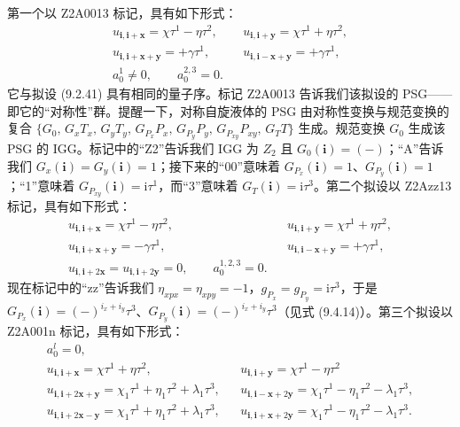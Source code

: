 第一个以 Z2A0013 标记，具有如下形式：
\begin{equation*}
\begin{array}{rcl}
u_{\pmb{i},\pmb{i}+\pmb{x}}=\chi\tau^{1}-\eta\tau^{2}, & & u_{\pmb{i},\pmb{i}+\pmb{y}}=\chi\tau^{1}+\eta\tau^{2},\\[2pt]
u_{\pmb{i},\pmb{i}+\pmb{x}+\pmb{y}}=+\gamma\tau^{1}, & & u_{\pmb{i},\pmb{i}-\pmb{x}+\pmb{y}}=+\gamma\tau^{1},\\[2pt]
a_{0}^{1}\neq0,\qquad a_{0}^{2,3}=0. & &
\end{array}
\tag{9.6.1}
\end{equation*}
它与拟设 (9.2.41) 具有相同的量子序。标记 Z2A0013 告诉我们该拟设的 PSG——即它的“对称性”群。提醒一下，对称自旋液体的 PSG 由对称性变换与规范变换的复合 $\{G_{0},\allowbreak\,G_{x}T_{x},\allowbreak\,G_{y}T_{y},\allowbreak\,G_{P_{x}}P_{x},\allowbreak\,G_{P_{y}}P_{y},\allowbreak\,G_{P_{xy}}P_{xy},\allowbreak\,G_{T}T\}$ 生成。规范变换 $G_{0}$ 生成该 PSG 的 IGG。标记中的“Z2”告诉我们 IGG 为 $Z_{2}$ 且 $G_{0}(\pmb{i})=(-)$；“A”告诉我们 $G_{x}(\pmb{i})=G_{y}(\pmb{i})=1$；接下来的“00”意味着 $G_{P_{x}}(\pmb{i})=1$、$G_{P_{y}}(\pmb{i})=1$；“1”意味着 $G_{P_{xy}}(\pmb{i})=\mathrm{i}\tau^{1}$，而“3”意味着 $G_{T}(\pmb{i})=\mathrm{i}\tau^{3}$。第二个拟设以 Z2Azz13 标记，具有如下形式：
\begin{equation*}
\begin{array}{rcl}
u_{\pmb{i},\pmb{i}+\pmb{x}}=\chi\tau^{1}-\eta\tau^{2}, & & u_{\pmb{i},\pmb{i}+\pmb{y}}=\chi\tau^{1}+\eta\tau^{2},\\[2pt]
u_{\pmb{i},\pmb{i}+\pmb{x}+\pmb{y}}=-\gamma\tau^{1}, & & u_{\pmb{i},\pmb{i}-\pmb{x}+\pmb{y}}=+\gamma\tau^{1},\\[2pt]
u_{\pmb{i},\pmb{i}+2\pmb{x}}=u_{\pmb{i},\pmb{i}+2\pmb{y}}=0,\qquad a_{0}^{1,2,3}=0. & &
\end{array}
\tag{9.6.2}
\end{equation*}
现在标记中的“zz”告诉我们 $\eta_{xpx}=\eta_{xpy}=-1$，$g_{P_{x}}=g_{P_{y}}=\mathrm{i}\tau^{3}$，于是 $G_{P_{x}}(\pmb{i})=(-)^{i_{x}+i_{y}}\tau^{3}$、$G_{P_{y}}(\pmb{i})=(-)^{i_{x}+i_{y}}\tau^{3}$（见式 (9.4.14)）。第三个拟设以 Z2A001n 标记，具有如下形式：
\begin{equation*}
\begin{array}{rcl}
a_{0}^{l}=0, & & \\[2pt]
u_{\pmb{i},\pmb{i}+\pmb{x}}=\chi\tau^{1}+\eta\tau^{2}, & & u_{\pmb{i},\pmb{i}+\pmb{y}}=\chi\tau^{1}-\eta\tau^{2}\\[2pt]
u_{\pmb{i},\pmb{i}+2\pmb{x}+\pmb{y}}=\chi_{1}\tau^{1}+\eta_{1}\tau^{2}+\lambda_{1}\tau^{3}, & & u_{\pmb{i},\pmb{i}-\pmb{x}+2\pmb{y}}=\chi_{1}\tau^{1}-\eta_{1}\tau^{2}-\lambda_{1}\tau^{3},\\[2pt]
u_{\pmb{i},\pmb{i}+2\pmb{x}-\pmb{y}}=\chi_{1}\tau^{1}+\eta_{1}\tau^{2}+\lambda_{1}\tau^{3}, & & u_{\pmb{i},\pmb{i}+\pmb{x}+2\pmb{y}}=\chi_{1}\tau^{1}-\eta_{1}\tau^{2}-\lambda_{1}\tau^{3}.
\end{array}
\tag{9.6.3}
\end{equation*}
